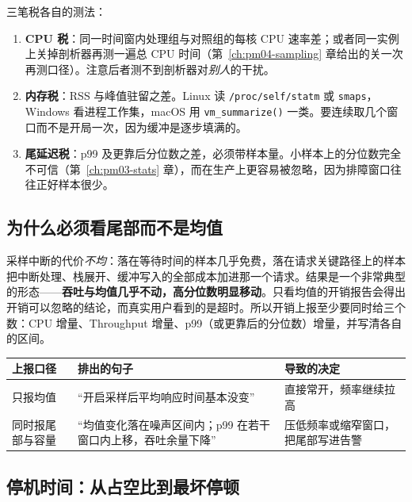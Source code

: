 \documentclass[12pt,a4paper,fontset=fandol]{ctexbook}
\newcommand{\Fn}[1]{\texttt{#1()}}
\newcommand{\Tp}[1]{\texttt{#1}}
\newcommand{\Bk}{\discretionary{}{}{}}
\newcommand{\Lang}[1]{\textsf{#1}}
\newcommand{\MCpu}{\Lang{CPU}}
\newcommand{\MThr}{\Lang{Throughput}}
\newcommand{\Mx}[1]{\textsf{#1}}
\begin{document}
三笔税各自的测法：

\begin{enumerate}
  \item \textbf{CPU 税}：同一时间窗内处理组与对照组的每核 \MCpu{} 速率差；或者同一实例上关掉剖析器再测一遍总 CPU 时间（第~\ref{ch:pm04-sampling} 章给出的关一次再测口径）。注意后者测不到剖析器对\emph{别人}的干扰。
  \item \textbf{内存税}：\Mx{RSS} 与峰值驻留之差。Linux 读 \Tp{/proc/{\Bk}self/{\Bk}statm} 或 \Tp{smaps}，Windows 看进程工作集，macOS 用 \Fn{vm{\Bk}\_summarize} 一类。要连续取几个窗口而不是开局一次，因为缓冲是逐步填满的。
  \item \textbf{尾延迟税}：\Mx{p99} 及更靠后分位数之差，必须带样本量。小样本上的分位数完全不可信（第~\ref{ch:pm03-stats} 章），而在生产上更容易被忽略，因为排障窗口往往正好样本很少。
\end{enumerate}

\subsection{为什么必须看尾部而不是均值}
\label{sub:pm14-tail}

采样中断的代价\emph{不均}：落在等待时间的样本几乎免费，落在请求关键路径上的样本把中断处理、栈展开、缓冲写入的全部成本加进那一个请求。结果是一个非常典型的形态——\textbf{吞吐与均值几乎不动，高分位数明显移动}。只看均值的开销报告会得出开销可以忽略的结论，而真实用户看到的是超时。所以开销上报至少要同时给三个数：\MCpu{} 增量、\MThr{} 增量、\Mx{p99}（或更靠后的分位数）增量，并写清各自的区间。

\begin{compare}[title={同一次实验，两种标题造成的两种决策}]
\label{box:pm14-overhead-report}
\begin{tabular}{p{}>{\raggedright\arraybackslash}p{}>{\raggedright\arraybackslash}p{}}
\toprule
上报口径 & 排出的句子 & 导致的决定 \\
\midrule
只报均值 & ``开启采样后平均响应时间基本没变'' & 直接常开，频率继续拉高 \\
同时报尾部与容量 & ``均值变化落在噪声区间内；\Mx{p99} 在若干窗口内上移，吞吐余量下降'' & 压低频率或缩窄窗口，把尾部写进告警 \\
\bottomrule
\end{tabular}
\end{compare}

\subsection{停机时间：从占空比到最坏停顿}
\label{sub:pm14-downtime}
\end{document}
